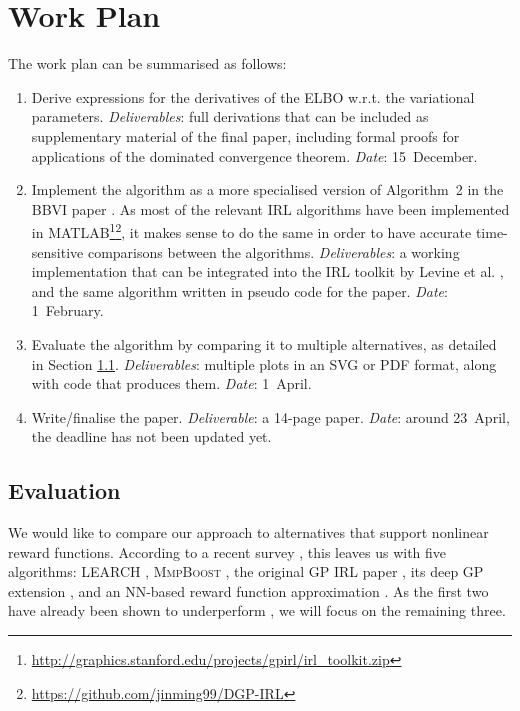 \documentclass{mprop}
\theoremstyle{definition}
\begin{document}
\section{Work Plan}

The work plan can be summarised as follows:
\begin{enumerate}
\item Derive expressions for the derivatives of the ELBO w.r.t. the variational
  parameters. \emph{Deliverables}: full derivations that can be included as
  supplementary material of the final paper, including formal proofs for
  applications of the dominated convergence theorem. \emph{Date}: 15~December.
\item Implement the algorithm as a more specialised version of Algorithm~2 in
  the BBVI paper \cite{DBLP:conf/aistats/RanganathGB14}. As most of the relevant
  IRL algorithms have been implemented in
  MATLAB\footnote{\url{http://graphics.stanford.edu/projects/gpirl/irl_toolkit.zip}}\footnote{\url{https://github.com/jinming99/DGP-IRL}},
  it makes sense to do the same in order to have accurate time-sensitive
  comparisons between the algorithms. \emph{Deliverables}: a working
  implementation that can be integrated into the IRL toolkit by Levine et al.
  \cite{DBLP:conf/nips/LevinePK11}, and the same algorithm written in pseudo
  code for the paper. \emph{Date}: 1~February.
\item Evaluate the algorithm by comparing it to multiple alternatives, as
  detailed in Section \ref{sec:evaluation}. \emph{Deliverables}: multiple plots
  in an SVG or PDF format, along with code that produces them. \emph{Date}:
  1~April.
\item Write/finalise the paper. \emph{Deliverable}: a 14-page paper.
  \emph{Date}: around 23~April, the deadline has not been updated yet.
\end{enumerate}

\subsection{Evaluation} \label{sec:evaluation}

We would like to compare our approach to alternatives that support nonlinear
reward functions. According to a recent survey
\cite{DBLP:journals/corr/abs-1806-06877}, this leaves us with five algorithms:
\textsc{LEARCH} \cite{DBLP:journals/arobots/RatliffSB09}, \textsc{MmpBoost}
\cite{DBLP:conf/nips/RatliffBBC06}, the original GP IRL paper
\cite{DBLP:conf/nips/LevinePK11}, its deep GP extension
\cite{DBLP:conf/uai/JinDAS17}, and an NN-based reward function
approximation \cite{wulfmeier2015maximum}. As the first two have already been
shown to underperform \cite{DBLP:conf/nips/LevinePK11}, we will focus on the
remaining three.
\end{document}
